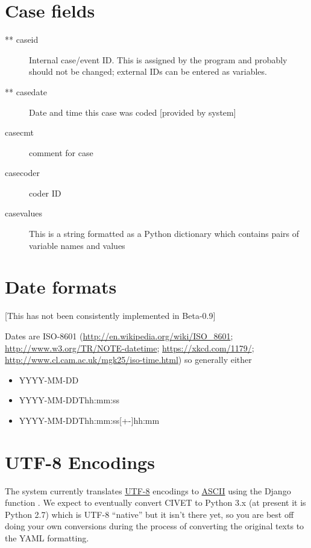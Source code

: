 \documentclass[letterpaper,10pt,english]{sphinxmanual}
\begin{document}
\section{Case fields}
\label{appendix2:case-fields}\begin{description}
\item[{** caseid}] \leavevmode
Internal case/event ID. This is assigned by the program and
probably should not be changed; external IDs can be entered as
variables.

\item[{** casedate}] \leavevmode
Date and time this case was coded {[}provided by system{]}

\item[{casecmt}] \leavevmode
comment for case

\item[{casecoder}] \leavevmode
coder ID

\item[{casevalues}] \leavevmode
This is a string formatted as a Python dictionary which contains
pairs of variable names and values

\end{description}


\section{Date formats}
\label{appendix2:date-formats}
{[}This has not been consistently implemented in Beta-0.9{]}

Dates are ISO-8601 (\href{http://en.wikipedia.org/wiki/ISO\_8601}{http://en.wikipedia.org/wiki/ISO\_8601};
\href{http://www.w3.org/TR/NOTE-datetime}{http://www.w3.org/TR/NOTE-datetime}; \href{https://xkcd.com/1179/}{https://xkcd.com/1179/};
\href{http://www.cl.cam.ac.uk/mgk25/iso-time.html}{http://www.cl.cam.ac.uk/mgk25/iso-time.html}) so generally either
\begin{itemize}
\item {} 
YYYY-MM-DD

\item {} 
YYYY-MM-DDThh:mm:ss

\item {} 
YYYY-MM-DDThh:mm:ss{[}+-{]}hh:mm

\end{itemize}


\section{UTF-8 Encodings}
\label{appendix2:utf-8-encodings}
The system currently translates \href{https://en.wikipedia.org/wiki/UTF-8}{UTF-8}
encodings to \href{https://en.wikipedia.org/wiki/ASCII}{ASCII} using the
Django function . We expect to eventually
convert CIVET to Python 3.x (at present it is Python 2.7) which
is UTF-8 “native” but it isn't there yet, so you are best off doing
your own conversions during the process of converting the original
texts to the YAML formatting.
\end{document}
